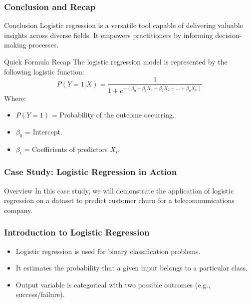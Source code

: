 \documentclass[aspectratio=169]{beamer}
\begin{document}
\begin{frame}[fragile]
    \frametitle{Conclusion and Recap}
    \begin{block}{Conclusion}
        Logistic regression is a versatile tool capable of delivering valuable insights across diverse fields. It empowers practitioners by informing decision-making processes.
    \end{block}

    \begin{block}{Quick Formula Recap}
        The logistic regression model is represented by the following logistic function:
        \begin{equation}
            P(Y = 1 | X) = \frac{1}{1 + e^{-(\beta_0 + \beta_1X_1 + \beta_2X_2 + ... + \beta_nX_n)}}
        \end{equation}
        Where:
        \begin{itemize}
            \item \( P(Y = 1) \) = Probability of the outcome occurring.
            \item \( \beta_0 \) = Intercept.
            \item \( \beta_i \) = Coefficients of predictors \( X_i \).
        \end{itemize}
    \end{block}
\end{frame}

\begin{frame}
    \frametitle{Case Study: Logistic Regression in Action}
    \begin{block}{Overview}
        In this case study, we will demonstrate the application of logistic regression on a dataset to predict customer churn for a telecommunications company.
    \end{block}
\end{frame}

\begin{frame}
    \frametitle{Introduction to Logistic Regression}
    \begin{itemize}
        \item Logistic regression is used for binary classification problems.
        \item It estimates the probability that a given input belongs to a particular class.
        \item Output variable is categorical with two possible outcomes (e.g., success/failure).
    \end{itemize}
\end{frame}
\end{document}
